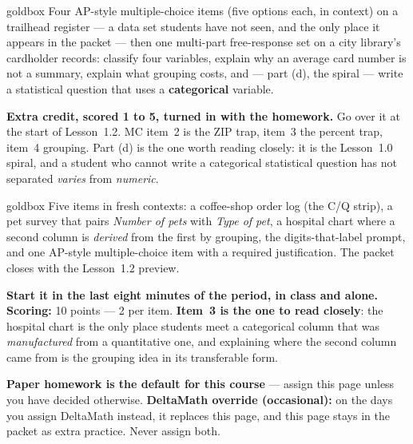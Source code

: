 \documentclass[10pt]{article}
\begin{document}
\boxguard
\begin{skillbox}{goldbox}
Four AP-style multiple-choice items (five options each, in context) on a trailhead register ---
a data set students have not seen, and the only place it appears in the packet ---
then one multi-part free-response set on a city library's cardholder records: classify four
variables, explain why an average card number is not a summary, explain what grouping costs, and
--- part (d), the spiral --- write a statistical question that uses a \textbf{categorical}
variable.

\textbf{Extra credit, scored 1 to 5, turned in with the homework.} Go over it at
the start of Lesson~1.2. MC item~2 is the ZIP trap, item~3 the percent trap, item~4 grouping.
Part (d) is the one worth reading closely: it is the Lesson~1.0 spiral, and a student who cannot
write a categorical statistical question has not separated \emph{varies} from \emph{numeric}.
\end{skillbox}

\boxguard
\begin{skillbox}{goldbox}
Five items in fresh contexts: a coffee-shop order log (the C/Q strip), a pet survey that pairs
\emph{Number of pets} with \emph{Type of pet}, a hospital chart where a second column is
\emph{derived} from the first by grouping, the digits-that-label prompt, and one AP-style
multiple-choice item with a required justification. The packet closes with the Lesson~1.2
preview.

\textbf{Start it in the last eight minutes of the period, in class and alone.} \textbf{Scoring:} 10 points --- 2 per
item. \textbf{Item~3 is the one to read closely}: the hospital chart is the only place students
meet a categorical column that was \emph{manufactured} from a quantitative one, and explaining
where the second column came from is the grouping idea in its transferable form.

\textbf{Paper homework is the default for this course} --- assign this page unless you have
decided otherwise. \textbf{DeltaMath override (occasional):} on the days you assign DeltaMath
instead, it replaces this page, and this page
stays in the packet as extra practice. Never assign both.
\end{skillbox}
\end{document}
